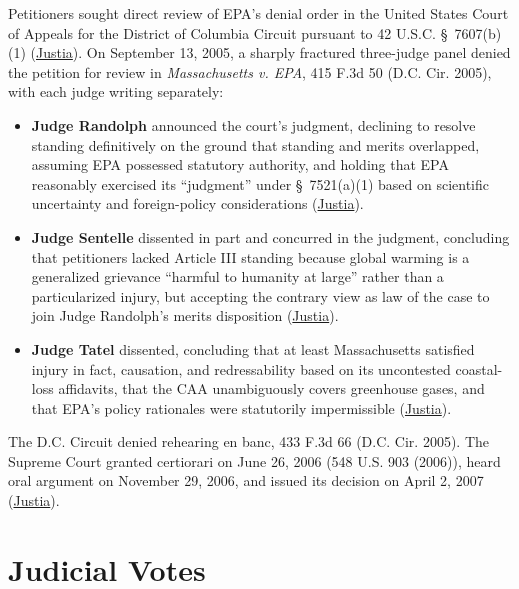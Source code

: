\documentclass[12pt]{article}
\begin{document}
Petitioners sought direct review of EPA's denial order in the United States Court of Appeals for the District of Columbia Circuit pursuant to 42 U.S.C. \S\ 7607(b)(1) (\href{https://supreme.justia.com/cases/federal/us/549/497/}{Justia}). On September 13, 2005, a sharply fractured three-judge panel denied the petition for review in \textit{Massachusetts v. EPA}, 415 F.3d 50 (D.C. Cir. 2005), with each judge writing separately:
\begin{itemize}
    \item \textbf{Judge Randolph} announced the court's judgment, declining to resolve standing definitively on the ground that standing and merits overlapped, assuming EPA possessed statutory authority, and holding that EPA reasonably exercised its ``judgment'' under \S\ 7521(a)(1) based on scientific uncertainty and foreign-policy considerations (\href{https://supreme.justia.com/cases/federal/us/549/497/}{Justia}).
    \item \textbf{Judge Sentelle} dissented in part and concurred in the judgment, concluding that petitioners lacked Article III standing because global warming is a generalized grievance ``harmful to humanity at large'' rather than a particularized injury, but accepting the contrary view as law of the case to join Judge Randolph's merits disposition (\href{https://supreme.justia.com/cases/federal/us/549/497/}{Justia}).
    \item \textbf{Judge Tatel} dissented, concluding that at least Massachusetts satisfied injury in fact, causation, and redressability based on its uncontested coastal-loss affidavits, that the CAA unambiguously covers greenhouse gases, and that EPA's policy rationales were statutorily impermissible (\href{https://supreme.justia.com/cases/federal/us/549/497/}{Justia}).
\end{itemize}

The D.C. Circuit denied rehearing en banc, 433 F.3d 66 (D.C. Cir. 2005). The Supreme Court granted certiorari on June 26, 2006 (548 U.S. 903 (2006)), heard oral argument on November 29, 2006, and issued its decision on April 2, 2007 (\href{https://supreme.justia.com/cases/federal/us/549/497/}{Justia}).

\section{Judicial Votes}
\end{document}
